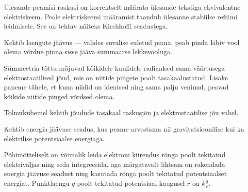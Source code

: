 \documentclass[10pt]{article}
\begin{document}
{%

\hint
Ülesande peamisi raskusi on korrektselt määrata ülesande tekstiga ekvivalentne elektriskeem. Peale elektriskeemi määramist taandub ülesanne stabiilse režiimi leidmisele. See on tehtav näiteks Kirchhoffi seadustega.
\probend
\bigskip


\hint
Kehtib laengute jäävus --- valides suvalise suletud pinna, peab pinda läbiv vool olema võrdne pinna sisse jääva summaarse lekkevooluga.
\probend
\bigskip


\hint
Sümmeetria tõttu mõjuvad kõikidele kuulidele radiaalsed sama väärtusega elektrostaatilised jõud, mis on niitide pingete poolt tasakaalustatud. Lisaks paneme tähele, et kuna niidid on identsed ning sama palju veninud, peavad kõikide niitide pinged võrdsed olema.
\probend
\bigskip


\hint
Tolmukübemel kehtib jõudude tasakaal raskusjõu ja elektrostaatilise jõu vahel.
\probend
\bigskip


\hint
Kehtib energia jäävuse seadus, kus peame arvestama nii gravitatsioonilise kui ka elektrilise potentsiaalse energiaga.
\probend
\bigskip


\hint
Põhimõtteliselt on võimalik leida elektroni kiirendus rõnga poolt tekitatud elektriväljas ning seda integreerida, aga märgatavalt lihtsam on rakendada energia jäävuse seadust ning kasutada rõnga poolt tekitatud potentsiaalset energiat. Punktlaengu $q$ poolt tekitatud potentsiaal kaugusel $r$ on $k\frac{q}{r}$.
\probend
\bigskip

}
\end{document}
